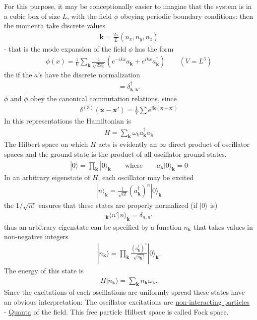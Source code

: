 \documentclass{article}
\begin{document}
For this purpose, it may be conceptionally easier to imagine that the system is in a cubic box of size $L$, with the field $\phi$ obeying periodic boundary conditions: then the momenta take discrete  values
\begin{align}
\mathbf{k}=\frac{2\pi}{L}(n_x,n_y,n_z)
\end{align}
 - that is the mode expansion of the field $\phi$ has the form
\begin{align}
\phi(x)=\frac{1}{V}\sum_{\mathbf{k}}\frac{1}{\sqrt{2\omega_k}}\left(e^{-ikx}a_\mathbf{k}+e^{ikx}a_\mathbf{k}^\dagger\right)\qquad(V=L^3)
\end{align}
the if the $a$'s have the discrete normalization 
\begin{align}
[a_\mathbf{k},a_{\mathbf{k}'}^\dagger]=\delta_\mathbf{k,\mathbf{k}'}^\dagger
\end{align}
$\phi$ and $\dot{\phi}$ obey the canonical commutation relations, since
\begin{align}
\delta^{(3)}(\mathbf{x-x'})=\frac{1}{V}\sum e^{i\mathbf{k}(\mathbf{x-x'})}
\end{align}
In this representations the Hamiltonian is
\begin{align}
H=\sum_{\mathbf{k}}\omega_ka_\mathbf{k}^\dagger a_\mathbf{k}
\end{align}
The Hilbert space on which $H$ acts is evidently an $\infty$ direct product of oscillator spaces and the ground state is the product of all oscillator ground states.
\begin{align}
|0\rangle=\prod_{\mathbf{k}}|0\rangle_\mathbf{k}\qquad\text{where}\qquad a_\mathbf{k}|0\rangle_\mathbf{k}=0
\end{align}
In an arbitrary eigenstate of $H$, each oscillator may be excited
\begin{align}
|n\rangle_\mathbf{k}=\frac{1}{\sqrt{n!}}(a_\mathbf{k}^\dagger)^n|0\rangle_\mathbf{k}
\end{align}
the $1/\sqrt{n!}$ ensures that these states are properly normalized (if $|0\rangle$ is)
\begin{align}
{}_\mathbf{k}\langle n'|n\rangle_\mathbf{k}=\delta_{n,n'}
\end{align}
thus an arbitrary eigenstate can be specified by a function $n_\mathbf{k}$ that takes values in non-negative integers
\begin{align}
|n_\mathbf{k}\rangle=\prod_\mathbf{k}\frac{(a_\mathbf{k}^\dagger)^n}{\sqrt{n_\mathbf{k}!}}|0\rangle_\mathbf{k}.
\end{align}
The energy of this state is
\begin{align}
H|n_\mathbf{k}\rangle=\sum_\mathbf{k}n_\mathbf{k}\omega_\mathbf{k}.
\end{align}
Since the excitations of each oscillations are uniformly spread these states have an obvious interpretation: The oscillator excitations are \underline{non-interacting particles} - \underline{Quanta} of the field. 
This free particle Hilbert space is called Fock space.
\end{document}
